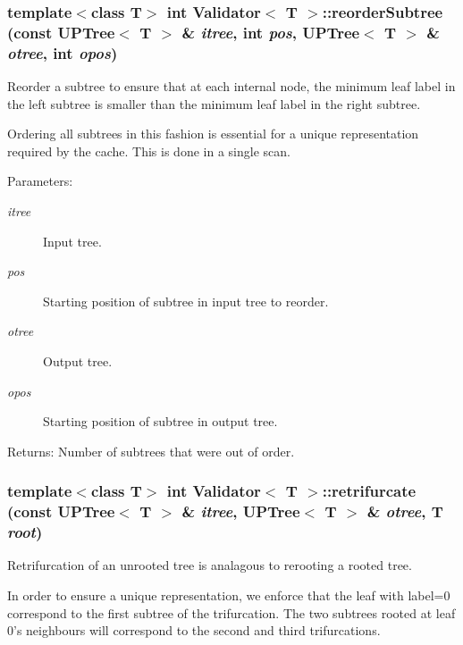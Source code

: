 \subsubsection{\setlength{\rightskip}{0pt plus 5cm}template$<$class T$>$ int {\bf Validator}$<$ T $>$::reorder\-Subtree (const {\bf UPTree}$<$ T $>$ \& {\em itree}, int {\em pos}, {\bf UPTree}$<$ T $>$ \& {\em otree}, int {\em opos})\hspace{0.3cm}{\tt  [protected]}}\label{classValidator_b0}


Reorder a subtree to ensure that at each internal node, the minimum leaf label in the left subtree is smaller than the minimum leaf label in the right subtree. 

Ordering all subtrees in this fashion is essential for a unique representation required by the cache. This is done in a single scan. \begin{Desc}
\item[Parameters:]
\begin{description}
\item[{\em itree}]Input tree. \item[{\em pos}]Starting position of subtree in input tree to reorder. \item[{\em otree}]Output tree. \item[{\em opos}]Starting position of subtree in output tree. \end{description}
\end{Desc}
\begin{Desc}
\item[Returns:]Number of subtrees that were out of order. \end{Desc}
\subsubsection{\setlength{\rightskip}{0pt plus 5cm}template$<$class T$>$ int {\bf Validator}$<$ T $>$::retrifurcate (const {\bf UPTree}$<$ T $>$ \& {\em itree}, {\bf UPTree}$<$ T $>$ \& {\em otree}, T {\em root})}\label{classValidator_a5}


Retrifurcation of an unrooted tree is analagous to rerooting a rooted tree. 

In order to ensure a unique representation, we enforce that the leaf with label=0 correspond to the first subtree of the trifurcation. The two subtrees rooted at leaf 0's neighbours will correspond to the second and third trifurcations.


